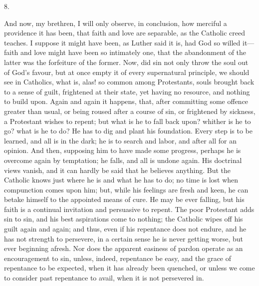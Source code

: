 8.

And now, my brethren, I will only observe, in conclusion, how
merciful a providence it has been, that faith and love are separable,
as the Catholic creed teaches. I suppose it might have been, as Luther
said it is, had God so willed it—faith and love might have been so
intimately one, that the abandonment of the latter was the forfeiture
of the former. Now, did sin not only throw the soul out of God's
favour, but at once empty it of every supernatural principle, we
should see in Catholics, what is, alas! so common among Protestants,
souls brought back to a sense of guilt, frightened at their state, yet
having no resource, and nothing to build upon. Again and again it
happens, that, after committing some offence greater than usual, or
being roused after a course of sin, or frightened by sickness, a
Protestant wishes to repent; but what is he to fall back upon? whither
is he to go? what is he to do? He has to dig and plant his foundation.
Every step is to be learned, and all is in the dark; he is to search
and labor, and after all for an opinion. And then, supposing him to
have made some progress, perhaps he is overcome again by temptation;
he falls, and all is undone again. His doctrinal views vanish, and it
can hardly be said that he believes anything. But the Catholic knows
just where he is and what he has to do; no time is lost when
compunction comes upon him; but, while his feelings are fresh and
keen, he can betake himself to the appointed means of cure. He may be
ever falling, but his faith is a continual invitation and persuasive
to repent. The poor Protestant adds sin to sin, and his best
aspirations come to nothing; the Catholic wipes off his guilt again
and again; and thus, even if his repentance does not endure, and he
has not strength to persevere, in a certain sense he is never getting
worse, but ever beginning afresh. Nor does the apparent easiness of
pardon operate as an encouragement to sin, unless, indeed, repentance
be easy, and the grace of repentance to be expected, when it has
already been quenched, or unless we come to consider past repentance
to avail, when it is not persevered in.

